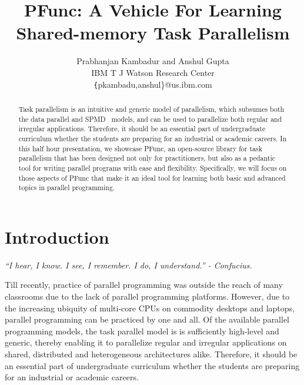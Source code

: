\documentclass[9pt,twocolumn,letter]{article}
\begin{document}
\title{PFunc: A Vehicle For Learning Shared-memory Task Parallelism}

\author{
Prabhanjan Kambadur and Anshul Gupta\\ 
IBM T J Watson Research Center\\
{\texttt \{pkambadu,anshul\}@us.ibm.com}
}

\date{}

\maketitle


\begin{abstract} 
Task parallelism is an intuitive and generic model of parallelism, which
subsumes both the data parallel and SPMD~\cite{darema2001} models, and can be
used to parallelize both regular and irregular applications.
%
Therefore, it should be an essential part of undergraduate curriculum whether
the students are preparing for an industrial or academic careers.
%
In this half hour presentation, we showcase PFunc, an open-source library for
task parallelism that has been designed not only for practitioners, but also as
a pedantic tool for writing parallel programs with ease and flexibility.
%
Specifically, we will focus on those aspects of PFunc that make it an ideal 
tool for learning both basic and advanced topics in parallel programming.
\end{abstract}

\section{Introduction}
\begin{center}
\small{\textit{``I hear, I know. I see, I remember. I do, I understand.'' -
Confucius.}}
\end{center}
%
Till recently, practice of parallel programming was outside the reach of many 
classrooms due to the lack of parallel programming platforms.
% 
However, due to the increasing ubiquity of multi-core CPUs on commodity
desktops and laptops, parallel programming can be practiced by one and all.
Of the available parallel programming models, the task parallel model is is
sufficiently high-level and generic, thereby enabling it to parallelize regular
and irregular applications on shared, distributed and heterogeneous
architectures alike.  
%
Therefore, it should be an essential part of undergraduate curriculum whether
the students are preparing for an industrial or academic careers.
\end{document}

